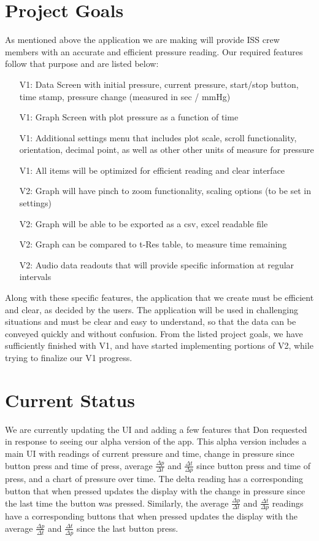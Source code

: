 \documentclass[onecolumn, draftclsnofoot,10pt, compsoc]{IEEEtran}
\begin{document}
\section{Project Goals}
As mentioned above the application we are making will provide ISS crew members with an accurate and efficient pressure reading.
Our required features follow that purpose and are listed below:
\begin{itemize}
\item[V1:] Data Screen with initial pressure, current pressure, start/stop button, time stamp, pressure change (measured in sec / mmHg)
\item[V1:] Graph Screen with plot pressure as a function of time
\item[V1:] Additional settings menu that includes plot scale, scroll functionality, orientation, decimal point, as well as other other units of measure for pressure
\item[V1:] All items will be optimized for efficient reading and clear interface
\item[V2:] Graph will have pinch to zoom functionality, scaling options (to be set in settings)
\item[V2:] Graph will be able to be exported as a csv, excel readable file
\item[V2:] Graph can be compared to t-Res table, to measure time remaining
\item[V2:] Audio data readouts that will provide specific information at regular intervals
\end{itemize}

Along with these specific features, the application that we create must be efficient and clear, as decided by the users.
The application will be used in challenging situations and must be clear and easy to understand, so that the data can be conveyed quickly and without confusion.
From the listed project goals, we have sufficiently finished with V1, and have started implementing portions of V2, while trying to finalize our V1 progress.


\section{Current Status}
    We are currently updating the UI and adding a few features that Don requested in response to seeing our alpha version of the app.
    This alpha version includes a main UI with readings of current pressure and time, change in pressure since button press and time of press, average $\frac{\Delta p}{\Delta t}$ and $\frac{\Delta t}{\Delta p}$ since button press and time of press, and a chart of pressure over time.
    The delta reading has a corresponding button that when pressed updates the display with the change in pressure since the last time the button was pressed.
    Similarly, the average $\frac{\Delta p}{\Delta t}$ and $\frac{\Delta t}{\Delta p}$ readings have a corresponding buttons that when pressed updates the display with the average $\frac{\Delta p}{\Delta t}$ and $\frac{\Delta t}{\Delta p}$ since the last button press.
\end{document}
